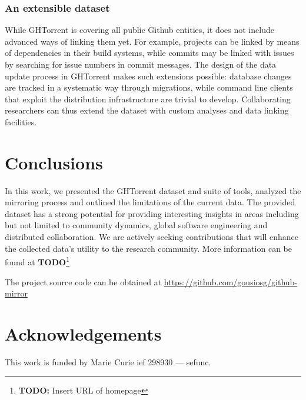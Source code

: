 \documentclass[conference]{IEEEtran}
\newcommand{\todo}[1]{\textbf{TODO}\footnote{\textbf{TODO:} #1}}
\begin{document}
\subsubsection{An extensible dataset} While GHTorrent is covering all 
 public Github entities, it does not include advanced ways of
linking them yet. For example, projects can be linked by means of dependencies
in their build systems, while commits may be linked with issues by
searching for issue numbers in commit messages. The design of the
data update process in GHTorrent makes such extensions possible:
database changes are tracked in a systematic way through migrations, while  
command line clients that exploit the distribution infrastructure are
trivial to develop. Collaborating researchers can thus extend the dataset
with custom analyses and data linking facilities.

\section{Conclusions}

In this work, we presented the GHTorrent dataset and suite of tools, analyzed
the mirroring process and outlined the limitations of the current data.  The
provided dataset has a strong potential for providing interesting insights in
areas including but not limited to community dynamics, global software
engineering and distributed collaboration. We are actively seeking contributions
that will enhance the collected data’s utility to the research community. 
More information can be found at \todo{Insert URL of homepage}

The project source code can be obtained at \url{https://github.com/gousiosg/github-mirror}

\section*{Acknowledgements}
This work is funded by Marie Curie {\sc ief} 298930 --- {\sc sefunc}.



\end{document}
